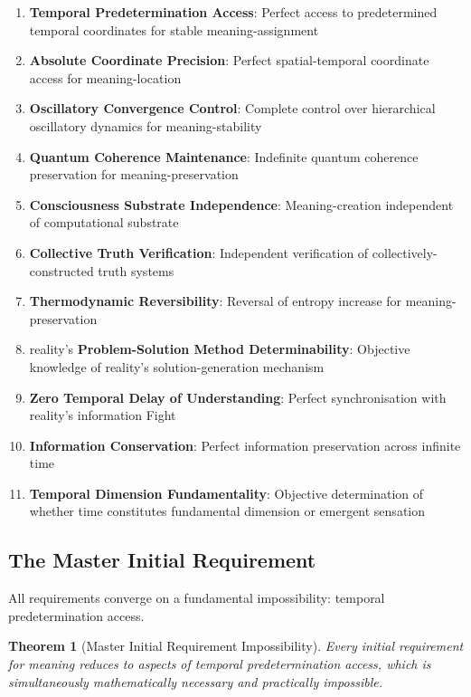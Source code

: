 \documentclass[12pt,a4paper]{article}
\newtheorem{theorem}{Theorem}
\begin{document}
\begin{enumerate}
\item \textbf{Temporal Predetermination Access}: Perfect access to predetermined temporal coordinates for stable meaning-assignment
\item \textbf{Absolute Coordinate Precision}: Perfect spatial-temporal coordinate access for meaning-location  
\item \textbf{Oscillatory Convergence Control}: Complete control over hierarchical oscillatory dynamics for meaning-stability
\item \textbf{Quantum Coherence Maintenance}: Indefinite quantum coherence preservation for meaning-preservation
\item \textbf{Consciousness Substrate Independence}: Meaning-creation independent of computational substrate
\item \textbf{Collective Truth Verification}: Independent verification of collectively-constructed truth systems
\item \textbf{Thermodynamic Reversibility}: Reversal of entropy increase for meaning-preservation
\item reality's \textbf{ Problem-Solution Method Determinability}: Objective knowledge of reality's solution-generation mechanism
\item \textbf{Zero Temporal Delay of Understanding}: Perfect synchronisation with reality's information Fight
\item \textbf{Information Conservation}: Perfect information preservation across infinite time
\item \textbf{Temporal Dimension Fundamentality}: Objective determination of whether time constitutes fundamental dimension or emergent sensation
\end{enumerate}

\subsection{The Master Initial Requirement}

All requirements converge on a fundamental impossibility: temporal predetermination access.

\begin{theorem}[Master Initial Requirement Impossibility]
Every initial requirement for meaning reduces to aspects of temporal predetermination access, which is simultaneously mathematically necessary and practically impossible.
\end{theorem}
\end{document}
